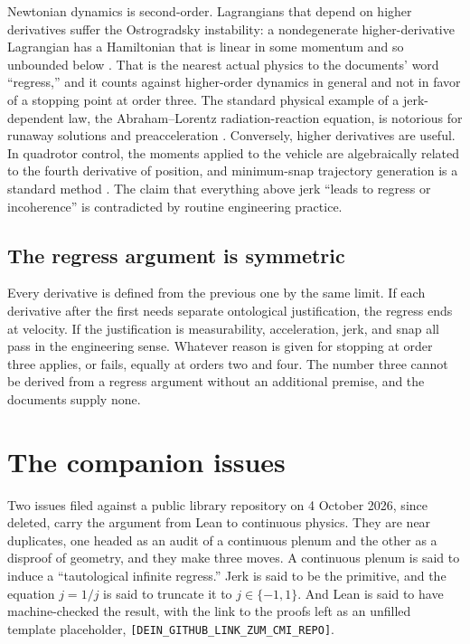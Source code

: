\documentclass[11pt]{article}
\begin{document}
Newtonian dynamics is second-order. Lagrangians that depend on higher derivatives suffer the Ostrogradsky instability: a nondegenerate higher-derivative Lagrangian has a Hamiltonian that is linear in some momentum and so unbounded below \cite{ostrogradsky1850,woodard2015}. That is the nearest actual physics to the documents' word ``regress,'' and it counts against higher-order dynamics in general and not in favor of a stopping point at order three. The standard physical example of a jerk-dependent law, the Abraham--Lorentz radiation-reaction equation, is notorious for runaway solutions and preacceleration \cite{jackson1999}. Conversely, higher derivatives are useful. In quadrotor control, the moments applied to the vehicle are algebraically related to the fourth derivative of position, and minimum-snap trajectory generation is a standard method \cite{mellinger2011}. The claim that everything above jerk ``leads to regress or incoherence'' is contradicted by routine engineering practice.

\subsection{The regress argument is symmetric}

Every derivative is defined from the previous one by the same limit. If each derivative after the first needs separate ontological justification, the regress ends at velocity. If the justification is measurability, acceleration, jerk, and snap all pass in the engineering sense. Whatever reason is given for stopping at order three applies, or fails, equally at orders two and four. The number three cannot be derived from a regress argument without an additional premise, and the documents supply none.

\section{The companion issues}
\label{sec:issues}

Two issues filed against a public library repository on 4 October 2026, since deleted, carry the argument from Lean to continuous physics. They are near duplicates, one headed as an audit of a continuous plenum and the other as a disproof of geometry, and they make three moves. A continuous plenum is said to induce a ``tautological infinite regress.'' Jerk is said to be the primitive, and the equation $j = 1/j$ is said to truncate it to $j\in\{-1,1\}$. And Lean is said to have machine-checked the result, with the link to the proofs left as an unfilled template placeholder, \texttt{[DEIN\_GITHUB\_LINK\_ZUM\_CMI\_REPO]}.
\end{document}
